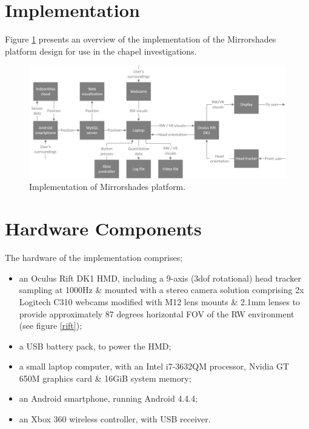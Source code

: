 \documentclass[oneside]{book}
\begin{document}

\section{Implementation}
Figure \ref{experimentalimplementation} presents an overview of the implementation of the Mirrorshades platform design for use in the chapel investigations.

\begin{figure}[h]
	\thispagestyle{empty}
	\begin{center}
		\includegraphics[width=.925\linewidth]{images/experimental-implementation.png}
		\caption{Implementation of Mirrorshades platform.}
		\label{experimentalimplementation}
	\end{center}
\end{figure}

\section{Hardware Components}
The hardware of the implementation comprises;

\begin{itemize}
	\item an Oculus Rift DK1 HMD, including a 9-axis (3dof rotational) head tracker sampling at 1000Hz \& mounted with a stereo camera solution comprising 2x Logitech C310 webcams modified with M12 lens mounts \& 2.1mm lenses to provide approximately 87 degrees horizontal FOV of the RW environment (see figure \ref{rift});
	\item a USB battery pack, to power the HMD;
	\item a small laptop computer, with an Intel i7-3632QM processor, Nvidia GT 650M graphics card \& 16GiB system memory;
	\item an Android smartphone, running Android 4.4.4;
	\item an Xbox 360 wireless controller, with USB receiver.
\end{itemize}
\end{document}
